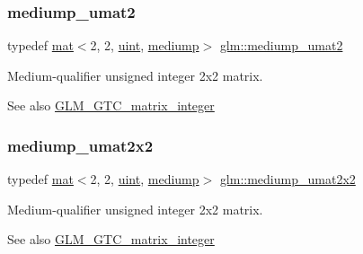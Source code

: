 \subsubsection{\texorpdfstring{mediump\+\_\+umat2}{mediump\_umat2}}
{\footnotesize\ttfamily typedef \mbox{\hyperlink{structglm_1_1mat}{mat}}$<$2, 2, \mbox{\hyperlink{group__core__precision_ga4fd29415871152bfb5abd588334147c8}{uint}}, \mbox{\hyperlink{namespaceglm_a36ed105b07c7746804d7fdc7cc90ff25a6416f3ea0c9025fb21ed50c4d6620482}{mediump}}$>$ \mbox{\hyperlink{group__gtc__matrix__integer_gaafd6d236ce051d138e3fdf53de3813e6}{glm\+::mediump\+\_\+umat2}}}

Medium-\/qualifier unsigned integer 2x2 matrix. \begin{DoxySeeAlso}{See also}
\mbox{\hyperlink{group__gtc__matrix__integer}{G\+L\+M\+\_\+\+G\+T\+C\+\_\+matrix\+\_\+integer}} 
\end{DoxySeeAlso}
\mbox{\label{group__gtc__matrix__integer_ga539a528818569c17e68e77afce7755c2}} 
\subsubsection{\texorpdfstring{mediump\+\_\+umat2x2}{mediump\_umat2x2}}
{\footnotesize\ttfamily typedef \mbox{\hyperlink{structglm_1_1mat}{mat}}$<$2, 2, \mbox{\hyperlink{group__core__precision_ga4fd29415871152bfb5abd588334147c8}{uint}}, \mbox{\hyperlink{namespaceglm_a36ed105b07c7746804d7fdc7cc90ff25a6416f3ea0c9025fb21ed50c4d6620482}{mediump}}$>$ \mbox{\hyperlink{group__gtc__matrix__integer_ga539a528818569c17e68e77afce7755c2}{glm\+::mediump\+\_\+umat2x2}}}

Medium-\/qualifier unsigned integer 2x2 matrix. \begin{DoxySeeAlso}{See also}
\mbox{\hyperlink{group__gtc__matrix__integer}{G\+L\+M\+\_\+\+G\+T\+C\+\_\+matrix\+\_\+integer}} 
\end{DoxySeeAlso}
\mbox{\label{group__gtc__matrix__integer_ga15d2790e10b27b145cd748abffde8968}} 
